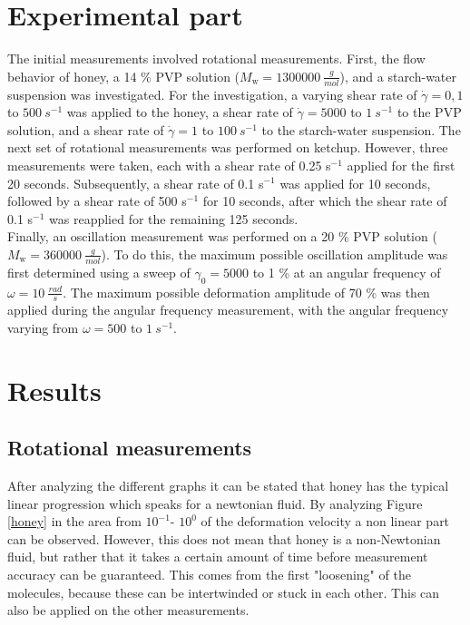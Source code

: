\documentclass[10pt,a4paper,ngerman]{scrartcl}
\begin{document}
\newpage

\section{Experimental part}

	The initial measurements involved rotational measurements. First, the flow behavior of honey, a 14 \% PVP solution 
	($M_\text{w} = \SI{1300000}{\frac{g}{mol}}$), and a starch-water suspension was investigated. For the investigation, a varying shear rate of 
	$\dot{\gamma} = 0,1$ to $\SI{500}{s^{-1}}$ was applied to the honey, a shear rate of $\dot{\gamma} = 5000$ to $\SI{1}{s^{-1}}$ to the PVP 
	solution, and a shear rate of $\dot{\gamma} = 1$ to $\SI{100}{s^{-1}}$ to the starch-water suspension. 
	The next set of rotational measurements was performed on ketchup. However, three measurements were taken, each with a shear rate of 0.25 s$^{-1}$ 
	applied for the first 20 seconds. Subsequently, a shear rate of 0.1 s$^{-1}$ was applied for 10 seconds, followed by a shear rate of 500 s$^{-1}$ for 10 
	seconds, after which the shear rate of 0.1 s$^{-1}$ was reapplied for the remaining 125 seconds.\\
	Finally, an oscillation measurement was performed on a 20 \% PVP solution ($M_\text{w} = \SI{360000}{\frac{g}{mol}}$). To do this, the maximum 
	possible oscillation amplitude was first determined using a sweep of $\gamma_0 = 5000$ to 1 \% at an angular frequency of 
	$\omega = \SI{10}{\frac{rad}{s}}$. The maximum possible deformation amplitude of 70 \% was then applied during the angular frequency 
	measurement, with the angular frequency varying from $\omega = 500$ to $\SI{1}{s^{-1}}$.


\section{Results}

	\subsection{Rotational measurements}

		After analyzing the different graphs it can be stated that honey has the typical linear progression which speaks for a newtonian fluid.
		By analyzing Figure \ref{honey} in the area from $10^{-1}$- $10^{0}$ of the deformation velocity a non linear part can be observed.
		However, this does not mean that honey is a non-Newtonian fluid, but rather that it takes a certain amount of time before measurement accuracy can be guaranteed.
		This comes from the first "loosening" of the molecules, because these can be intertwinded or stuck in each other.
		This can also be applied on the other measurements.
\end{document}
